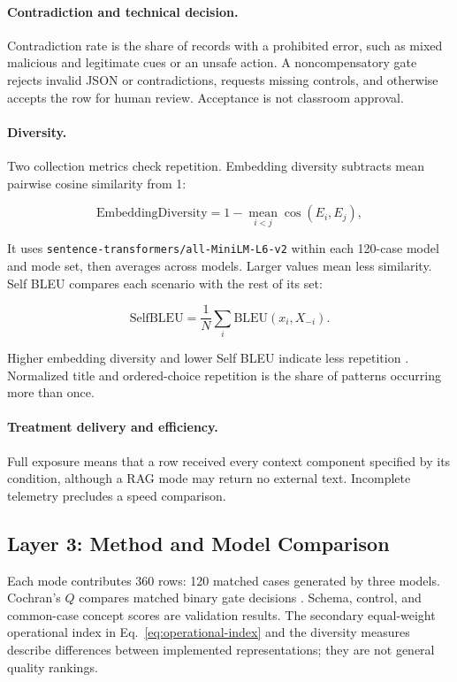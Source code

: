 \documentclass[runningheads]{llncs}
\begin{document}
\paragraph{Contradiction and technical decision.}
Contradiction rate is the share of records with a prohibited error, such as mixed
malicious and legitimate cues or an unsafe action. A noncompensatory gate rejects
invalid JSON or contradictions, requests missing controls, and otherwise accepts
the row for human review. Acceptance is not classroom approval.

\paragraph{Diversity.}
Two collection metrics check repetition. Embedding diversity subtracts mean
pairwise cosine similarity from 1:

\begin{equation}
\mathrm{EmbeddingDiversity}=1-\operatorname*{mean}_{i<j}
\cos(E_i,E_j),
\end{equation}

It uses \texttt{sentence-transformers/all-MiniLM-L6-v2} within each 120-case model
and mode set, then averages across models. Larger values mean less similarity.
Self BLEU compares each scenario with the rest of its set:

\begin{equation}
\mathrm{SelfBLEU}=\frac{1}{N}\sum_i \mathrm{BLEU}(x_i,X_{-i}).
\end{equation}

Higher embedding diversity and lower Self BLEU indicate less repetition
\cite{reimers2019,tevet2021}. Normalized title and ordered-choice repetition is the
share of patterns occurring more than once.

\paragraph{Treatment delivery and efficiency.}
Full exposure means that a row received every context component specified by its
condition, although a RAG mode may return no external text. Incomplete telemetry
precludes a speed comparison.

\subsection{Layer 3: Method and Model Comparison}

Each mode contributes 360 rows: 120 matched cases generated by three models.
Cochran's $Q$ compares matched binary gate decisions \cite{cochran1950}. Schema,
control, and common-case concept scores are validation results. The secondary
equal-weight operational index in Eq.~\ref{eq:operational-index} and the diversity measures describe differences
between implemented representations; they are not general quality rankings.
\end{document}
